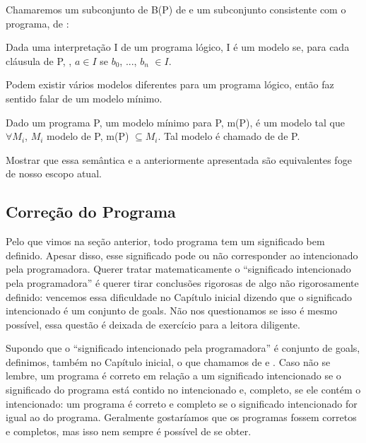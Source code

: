 \documentclass{article}
\begin{document}
  Chamaremos um subconjunto de B(P) de  e um
  subconjunto consistente com o programa, de :

\begin{definition} Dada uma interpretação I de um programa lógico, I é
  um modelo se, para cada cláusula de P, , $a \in I$ se $b_0$, ..., $b_n$ $\in I$. 
\end{definition}

 Podem existir vários modelos diferentes para um programa lógico,
 então faz sentido falar de um modelo mínimo.

\begin{definition} Dado um programa P, um modelo mínimo para P, m(P),
  é um modelo tal que $\forall M_i$, $M_i$ modelo de P, m(P)
  $\subseteq M_i$. Tal modelo é chamado de  de P. 
\end{definition}

Mostrar que essa semântica e a anteriormente apresentada são
equivalentes foge de nosso escopo atual.

\subsection{Correção do Programa}

Pelo que vimos na seção anterior, todo programa tem um significado bem
definido. Apesar disso, esse significado pode ou não corresponder ao
intencionado pela programadora. Querer tratar matematicamente o
``significado intencionado pela programadora'' é querer tirar
conclusões rigorosas de algo não rigorosamente definido: vencemos essa
dificuldade no Capítulo inicial dizendo que o significado intencionado
é um conjunto de goals. Não nos questionamos se isso é mesmo possível,
essa questão é deixada de exercício para a leitora diligente.

Supondo que o ``significado intencionado pela programadora'' é
conjunto de goals, definimos, também no Capítulo inicial, o que
chamamos de  e . Caso não se lembre, um programa é correto em relação a um
significado intencionado se o significado do programa está contido no
intencionado e, completo, se ele contém o intencionado: um programa é
correto e completo se o significado intencionado for igual ao do
programa.  Geralmente gostaríamos que os programas fossem corretos e
completos, mas isso nem sempre é possível de se obter.
\end{document}
